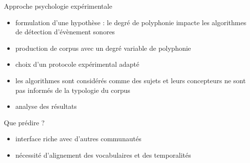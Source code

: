 \begin{frame}{Approche  \og psychologie expérimentale \fg}
\begin{itemize}
\item formulation d'une hypothèse : le degré de polyphonie impacte les algorithmes de détection d'évènement sonores
\item production de corpus avec un degré variable de polyphonie
\item choix d'un protocole expérimental adapté
\item les algorithmes sont considérés comme des sujets et leurs concepteurs ne sont pas informés de la typologie du corpus
\item analyse des résultats
\end{itemize} 
\end{frame}

\begin{frame}{Que prédire ?}
\begin{center}
\end{center}
\vspace{.8cm}
\begin{itemize}
\item interface riche avec d'autres communautés
\item nécessité d'alignement des vocabulaires et des temporalités
\end{itemize}
\end{frame}

